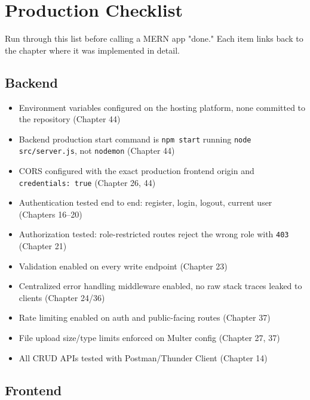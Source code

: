 \chapter{Production Checklist}

\begin{notebox}[NOTE]
Run through this list before calling a MERN app "done." Each item links
back to the chapter where it was implemented in detail.
\end{notebox}

\section{Backend}

\begin{itemize}
\item[$\square$] Environment variables configured on the hosting
platform, none committed to the repository (Chapter 44)
\item[$\square$] Backend production start command is \texttt{npm start}
running \texttt{node src/server.js}, not \texttt{nodemon} (Chapter 44)
\item[$\square$] CORS configured with the exact production frontend
origin and \texttt{credentials: true} (Chapter 26, 44)
\item[$\square$] Authentication tested end to end: register, login,
logout, current user (Chapters 16--20)
\item[$\square$] Authorization tested: role-restricted routes reject the
wrong role with \texttt{403} (Chapter 21)
\item[$\square$] Validation enabled on every write endpoint (Chapter 23)
\item[$\square$] Centralized error handling middleware enabled, no raw
stack traces leaked to clients (Chapter 24/36)
\item[$\square$] Rate limiting enabled on auth and public-facing routes
(Chapter 37)
\item[$\square$] File upload size/type limits enforced on Multer config
(Chapter 27, 37)
\item[$\square$] All CRUD APIs tested with Postman/Thunder Client
(Chapter 14)
\end{itemize}

\section{Frontend}

